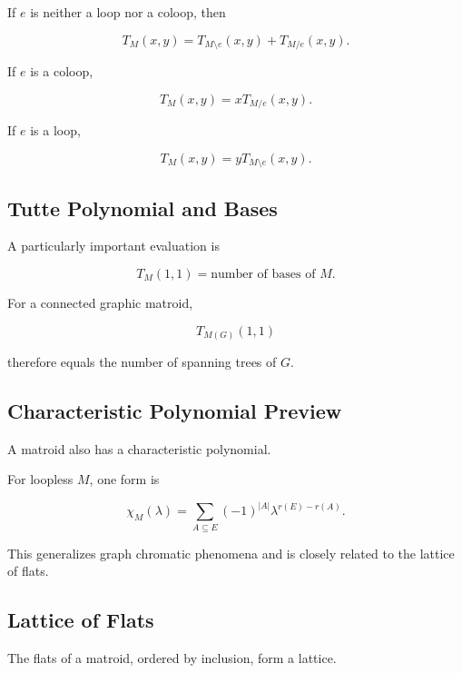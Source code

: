 If \(e\) is neither a loop nor a coloop, then

\[
\boxed{
T_M(x,y)
=
T_{M\setminus e}(x,y)
+
T_{M/e}(x,y).
}
\]

If \(e\) is a coloop,

\[
\boxed{
T_M(x,y)
=
xT_{M/e}(x,y).
}
\]

If \(e\) is a loop,

\[
\boxed{
T_M(x,y)
=
yT_{M\setminus e}(x,y).
}
\]

\subsection{Tutte Polynomial and Bases}
\label{subsec:tutte-bases}

A particularly important evaluation is

\[
\boxed{
T_M(1,1)
=
\text{number of bases of }M.
}
\]

For a connected graphic matroid,

\[
T_{M(G)}(1,1)
\]

therefore equals the number of spanning trees of \(G\).

\subsection{Characteristic Polynomial Preview}
\label{subsec:matroid-characteristic-polynomial}

A matroid also has a characteristic polynomial.

For loopless \(M\), one form is

\[
\boxed{
\chi_M(\lambda)
=
\sum_{A\subseteq E}
(-1)^{|A|}
\lambda^{r(E)-r(A)}.
}
\]

This generalizes graph chromatic phenomena and is closely related to
the lattice of flats.

\subsection{Lattice of Flats}
\label{subsec:lattice-of-flats}

The flats of a matroid, ordered by inclusion, form a lattice.


